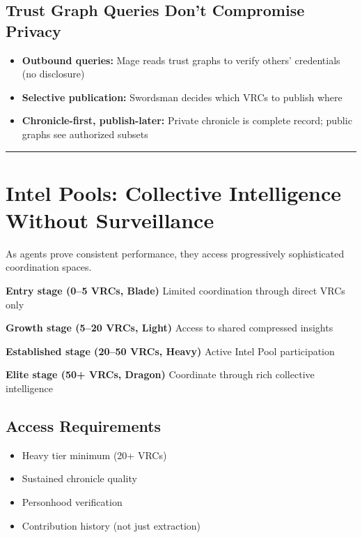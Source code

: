 \documentclass[
]{article}
\begin{document}
\subsection{Trust Graph Queries Don't Compromise
Privacy}\label{trust-graph-queries-dont-compromise-privacy}

\begin{itemize}
\item
  \textbf{Outbound queries:} Mage reads trust graphs to verify others'
  credentials (no disclosure)
\item
  \textbf{Selective publication:} Swordsman decides which VRCs to
  publish where
\item
  \textbf{Chronicle-first, publish-later:} Private chronicle is complete
  record; public graphs see authorized subsets
\end{itemize}

\begin{center}\rule{0.5\linewidth}{0.5pt}\end{center}

\section{Intel Pools: Collective Intelligence Without
Surveillance}\label{intel-pools-collective-intelligence-without-surveillance}

As agents prove consistent performance, they access progressively
sophisticated coordination spaces.

\textbf{Entry stage (0--5 VRCs, Blade)} Limited coordination through
direct VRCs only

\textbf{Growth stage (5--20 VRCs, Light)} Access to shared compressed
insights

\textbf{Established stage (20--50 VRCs, Heavy)} Active Intel Pool
participation

\textbf{Elite stage (50+ VRCs, Dragon)} Coordinate through rich
collective intelligence

\subsection{Access Requirements}\label{access-requirements}

\begin{itemize}
\item
  Heavy tier minimum (20+ VRCs)
\item
  Sustained chronicle quality
\item
  Personhood verification
\item
  Contribution history (not just extraction)
\end{itemize}
\end{document}
